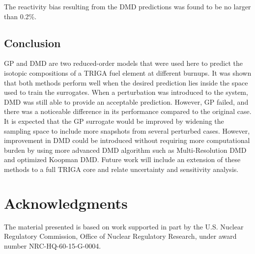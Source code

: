 \documentclass{anstrans}
\begin{document}
 The reactivity bias resulting from the DMD predictions was found to be no larger than 0.2\%.
\subsection{Conclusion}
GP and DMD are two reduced-order models that were used here  to predict the isotopic compositions of a TRIGA fuel element at different burnups.
It was shown that both methods perform well when the desired prediction lies inside the space used to train the surrogates. When a perturbation was introduced to the system, DMD  was still able to provide  an acceptable prediction. However, GP failed, and there was a noticeable difference in its performance compared to the original case.
It is expected that the GP surrogate would be improved by widening the sampling space to include more snapshots from several perturbed cases. However, improvement in DMD could be introduced without requiring more computational burden  by using more advanced DMD algorithm such as Multi-Resolution DMD and optimized Koopman DMD.
Future work will include an extension of these methods to  
a full TRIGA core and relate uncertainty and sensitivity analysis.



\section{Acknowledgments}
The material \cite{bowman2011scale} presented is based on work supported in part by the U.S. Nuclear Regulatory Commission, Office of Nuclear Regulatory Research, under award number NRC-HQ-60-15-G-0004.


\end{document}
